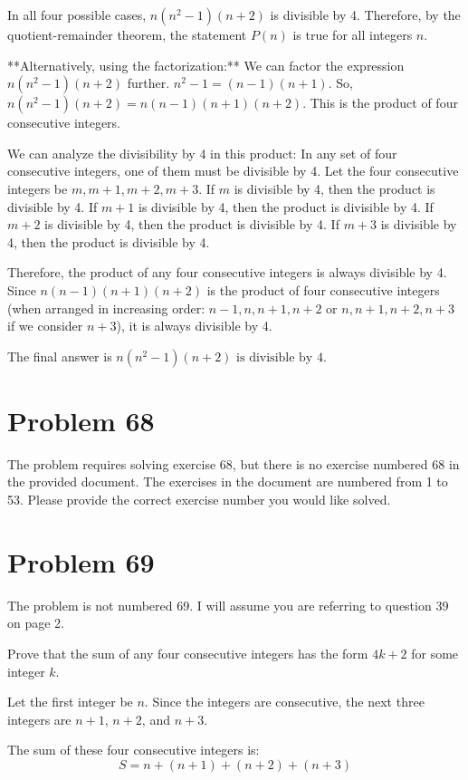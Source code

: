 \documentclass{article}
\begin{document}
In all four possible cases, $n(n^2 - 1)(n + 2)$ is divisible by 4. Therefore, by the quotient-remainder theorem, the statement $P(n)$ is true for all integers $n$.

**Alternatively, using the factorization:**
We can factor the expression $n(n^2 - 1)(n + 2)$ further.
$n^2 - 1 = (n - 1)(n + 1)$.
So, $n(n^2 - 1)(n + 2) = n(n - 1)(n + 1)(n + 2)$.
This is the product of four consecutive integers.

We can analyze the divisibility by 4 in this product:
In any set of four consecutive integers, one of them must be divisible by 4.
Let the four consecutive integers be $m, m+1, m+2, m+3$.
If $m$ is divisible by 4, then the product is divisible by 4.
If $m+1$ is divisible by 4, then the product is divisible by 4.
If $m+2$ is divisible by 4, then the product is divisible by 4.
If $m+3$ is divisible by 4, then the product is divisible by 4.

Therefore, the product of any four consecutive integers is always divisible by 4.
Since $n(n - 1)(n + 1)(n + 2)$ is the product of four consecutive integers (when arranged in increasing order: $n-1, n, n+1, n+2$ or $n, n+1, n+2, n+3$ if we consider $n+3$), it is always divisible by 4.

The final answer is $\boxed{n(n^2 - 1)(n + 2) \text{ is divisible by } 4}$.

\newpage

\section*{Problem 68}
The problem requires solving exercise 68, but there is no exercise numbered 68 in the provided document. The exercises in the document are numbered from 1 to 53. Please provide the correct exercise number you would like solved.

\newpage

\section*{Problem 69}
The problem is not numbered 69. I will assume you are referring to question 39 on page 2.

Prove that the sum of any four consecutive integers has the form $4k + 2$ for some integer $k$.

Let the first integer be $n$.
Since the integers are consecutive, the next three integers are $n+1$, $n+2$, and $n+3$.

The sum of these four consecutive integers is:
$$ S = n + (n+1) + (n+2) + (n+3) $$
\end{document}
